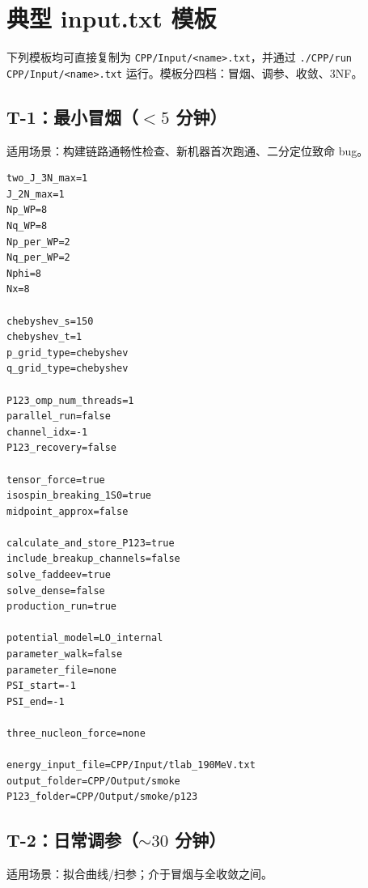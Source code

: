 \section{典型 input.txt 模板}
\label{sec:appE_templates}

下列模板均可直接复制为 \texttt{CPP/Input/<name>.txt}，并通过 \texttt{./CPP/run CPP/Input/<name>.txt} 运行。模板分四档：冒烟、调参、收敛、3NF。

\subsection{T-1：最小冒烟（\(<5\) 分钟）}
\label{subsec:appE_T1}

适用场景：构建链路通畅性检查、新机器首次跑通、二分定位致命 bug。

\begin{lstlisting}[style=config,caption={\texttt{input\_smoke.txt}：最小冒烟档},label={lst:appE_smoke}]
two_J_3N_max=1
J_2N_max=1
Np_WP=8
Nq_WP=8
Np_per_WP=2
Nq_per_WP=2
Nphi=8
Nx=8

chebyshev_s=150
chebyshev_t=1
p_grid_type=chebyshev
q_grid_type=chebyshev

P123_omp_num_threads=1
parallel_run=false
channel_idx=-1
P123_recovery=false

tensor_force=true
isospin_breaking_1S0=true
midpoint_approx=false

calculate_and_store_P123=true
include_breakup_channels=false
solve_faddeev=true
solve_dense=false
production_run=true

potential_model=LO_internal
parameter_walk=false
parameter_file=none
PSI_start=-1
PSI_end=-1

three_nucleon_force=none

energy_input_file=CPP/Input/tlab_190MeV.txt
output_folder=CPP/Output/smoke
P123_folder=CPP/Output/smoke/p123
\end{lstlisting}

\subsection{T-2：日常调参（\(\sim 30\) 分钟）}
\label{subsec:appE_T2}

适用场景：拟合曲线/扫参；介于冒烟与全收敛之间。

